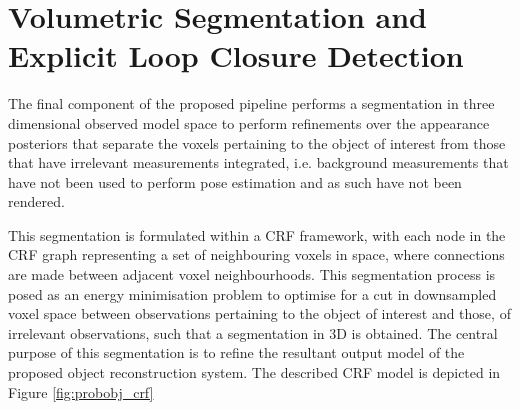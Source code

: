 \section{Volumetric Segmentation and Explicit Loop Closure Detection}
The final component of the proposed pipeline performs a segmentation in three
dimensional observed model space to perform refinements over the appearance
posteriors that separate the voxels pertaining to the object of interest from
those that have irrelevant measurements integrated, i.e. background measurements
that have not been used to perform pose estimation and as such have not been rendered.

This segmentation is formulated within a CRF framework, with each node in the
CRF graph representing a set of neighbouring voxels in space, where connections
are made between adjacent voxel neighbourhoods. This segmentation process is
posed as an energy minimisation problem to optimise for a cut in downsampled
voxel space between observations pertaining to the object of interest and those,
of irrelevant observations, such that a segmentation in 3D is obtained. The
central purpose of this segmentation is to refine the resultant output model of
the proposed object reconstruction system. The described CRF model is depicted
in Figure \ref{fig:probobj_crf}

